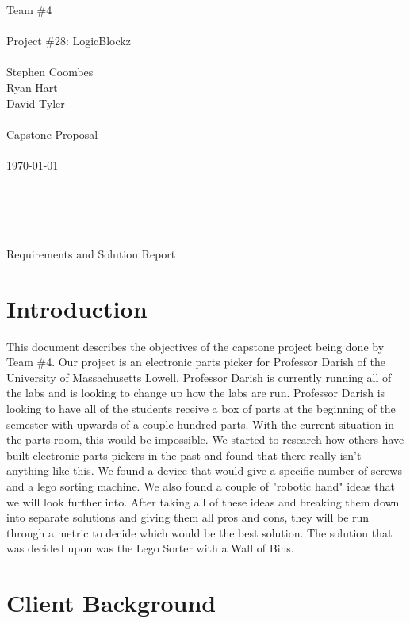 \documentclass[12pt]{report}
\begin{document}

\noindent Team \#4 \\  \\
Project \#28: LogicBlockz \\ \\
Stephen Coombes \\
Ryan Hart \\
David Tyler \\ \\
Capstone Proposal \\ \\
\today \\ \\ \\ \\ \\
\centerline{Requirements and Solution Report}
\newpage


\section*{Introduction}

This document describes the objectives of the capstone project being done by Team \#4. Our project is an electronic parts picker for Professor Darish of the University of Massachusetts Lowell. Professor Darish is currently running all of the labs and is looking to change up how the labs are run. Professor Darish is looking to have all of the students receive a box of parts at the beginning of the semester with upwards of a couple hundred parts. With the current situation in the parts room, this would be impossible. We started to research how others have built electronic parts pickers in the past and found that there really isn't anything like this. We found a device that would give a specific number of screws and a lego sorting machine. We also found a couple of "robotic hand" ideas that we will look further into. After taking all of these ideas and breaking them down into separate solutions and giving them all pros and cons, they will be run through a metric to decide which would be the best solution. The solution that was decided upon was the Lego Sorter with a Wall of Bins.


\section*{Client Background}
\end{document}
